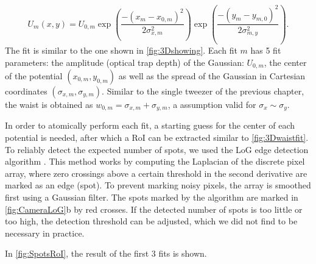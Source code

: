 \begin{equation}\label{eq:2DGaussianNumberK}
    U_m(x,y) = U_{0,m}\exp{\left(\frac{-(x_m-x_{0,m})^2}{2\sigma_{x,m}^2}\right)}
    \exp{\left( \frac{-(y_m-y_{m,0})^2}{2\sigma_{m,y}^2} \right)}.
\end{equation}
The fit is similar to the one shown in \cref{fig:3Dshowing}.
Each fit $m$ has 5 fit parameters: the amplitude (optical trap depth) of the Gaussian: $U_{0,m}$, the center of the potential $(x_{0,m}, y_{0,m})$ as well as the spread of the Gaussian in Cartesian coordinates $(\sigma_{x,m},\sigma_{y,m})$.
Similar to the single tweezer of the previous chapter, the waist is obtained as $w_{0,m} = \sigma_{x,m}+\sigma_{y,m}$, a assumption valid for $\sigma_x\sim\sigma_y$.

In order to atomically perform each fit, a starting guess for the center of each potential is needed, after which a \ac{RoI} can be extracted similar to \cref{fig:3Dwaistfit}.
To reliably detect the expected number of spots, we used the \ac{LoG} edge detection algorithm \cite{Haralick1992}. This method works by computing the Laplacian of the discrete pixel array, where zero crossings above a certain threshold in the second derivative are marked as an edge (spot). 
To prevent marking noisy pixels, the array is smoothed first using a Gaussian filter. 
The spots marked by the algorithm are marked in \ref{fig:CameraLoG}b by red crosses. 
If the detected number of spots is too little or too high, the detection threshold can be adjusted, which we did not find to be necessary in practice. 


In \cref{fig:SpotsRoI}, the result of the first 3 fits is shown. 

